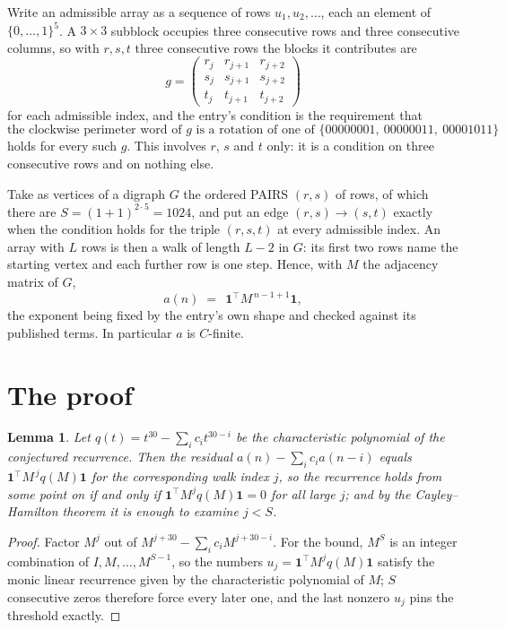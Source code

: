 \documentclass[11pt,a4paper]{article}
\theoremstyle{plain}
\newtheorem{lemma}[theorem]{Lemma}
\theoremstyle{definition}
\begin{document}
Write an admissible array as a sequence of rows $u_1,u_2,\dots$, each an element of
$\{0,\dots,1\}^{5}$. A $3\times3$ subblock occupies three consecutive rows and
three consecutive columns, so with $r,s,t$ three consecutive rows the blocks it
contributes are
\[
g=\begin{pmatrix}r_j&r_{j+1}&r_{j+2}\\ s_j&s_{j+1}&s_{j+2}\\ t_j&t_{j+1}&t_{j+2}\end{pmatrix}
\]
for each admissible index, and the entry's condition is the requirement that
\[
\text{the clockwise perimeter word of }g\text{ is a rotation of one of }\{00000001,\ 00000011,\ 00001011\}
\]
holds for every such $g$. This involves $r$, $s$ and $t$ only: it is a condition on
three consecutive rows and on nothing else.

Take as vertices of a digraph $G$ the ordered PAIRS $(r,s)$ of rows, of which there are
$S=(1+1)^{2\cdot5}=1024$, and put an edge $(r,s)\to(s,t)$ exactly when the condition
holds for the triple $(r,s,t)$ at every admissible index. An array with $L$ rows is then a
walk of length $L-2$ in $G$: its first two rows name the starting vertex and each further
row is one step. Hence, with $M$ the adjacency matrix of $G$,
\[
a(n)\;=\;\,\mathbf{1}^{\!\top}M^{\,n-1+1}\mathbf{1},
\]
the exponent being fixed by the entry's own shape and checked against its published terms.
In particular $a$ is $C$-finite.

\section{The proof}

\begin{lemma}\label{lem:crit}
Let $q(t)=t^{30}-\sum_i c_it^{30-i}$ be the characteristic polynomial of the
conjectured recurrence. Then the residual $a(n)-\sum_ic_ia(n-i)$ equals
$\mathbf{1}^{\!\top}M^{\,j}q(M)\mathbf{1}$ for the corresponding walk index
$j$, so the recurrence holds from some point on if and only if
$\mathbf{1}^{\!\top}M^{j}q(M)\mathbf{1}=0$ for all large $j$; and by the
Cayley--Hamilton theorem it is enough to examine $j<S$.
\end{lemma}

\begin{proof}
Factor $M^{j}$ out of $M^{j+30}-\sum_ic_iM^{j+30-i}$. For the bound, $M^{S}$
is an integer combination of $I,M,\dots,M^{S-1}$, so the numbers
$u_j=\mathbf{1}^{\!\top}M^{j}q(M)\mathbf{1}$ satisfy the monic linear recurrence given by
the characteristic polynomial of $M$; $S$ consecutive zeros therefore force every later one,
and the last nonzero $u_j$ pins the threshold exactly.
\end{proof}
\end{document}

